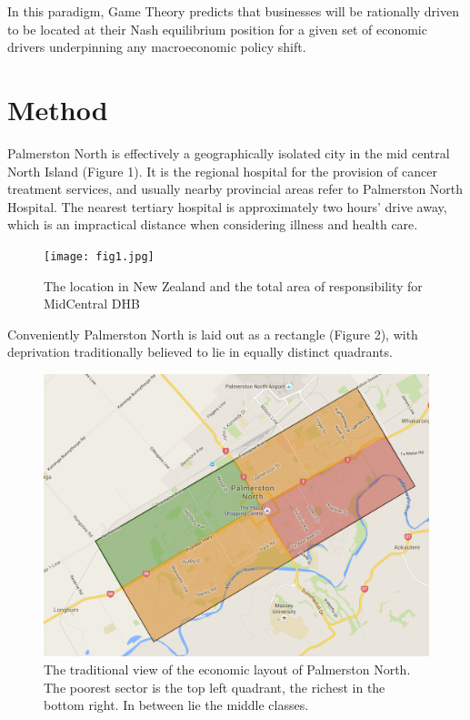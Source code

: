 \documentclass[11pt,a4paper]{article}
\begin{document}
In this paradigm,  Game Theory predicts that businesses will be rationally driven to be located at their Nash equilibrium position for a given set of economic drivers underpinning any macroeconomic policy shift. \\


\pagebreak
\section{Method}
Palmerston North is effectively a geographically isolated city in the mid central North Island (Figure 1). It is the regional hospital for the provision of cancer treatment services, and usually nearby provincial areas refer to Palmerston North Hospital. The nearest tertiary hospital is approximately two  hours’ drive away, which is an impractical distance when considering illness and health care.\\


\begin{figure}[htp]
\centering
\texttt{[image: fig1.jpg]}
\caption{The location in New Zealand and the total area of responsibility for MidCentral DHB}
\label{MidCentral District Health Board}
\end{figure}


Conveniently Palmerston North is laid out as a rectangle (Figure 2), with deprivation traditionally believed to lie in equally distinct quadrants.\\


\begin{figure}[htp]
\centering
\includegraphics[scale=0.20]{fig2.png}
\caption{The traditional view of the economic layout of Palmerston North. The poorest sector is the top left quadrant, the richest in the bottom right. In between lie the middle classes.}
\label{Traditional view of the spatial economics of Palmerston North City}
\end{figure}
\end{document}
